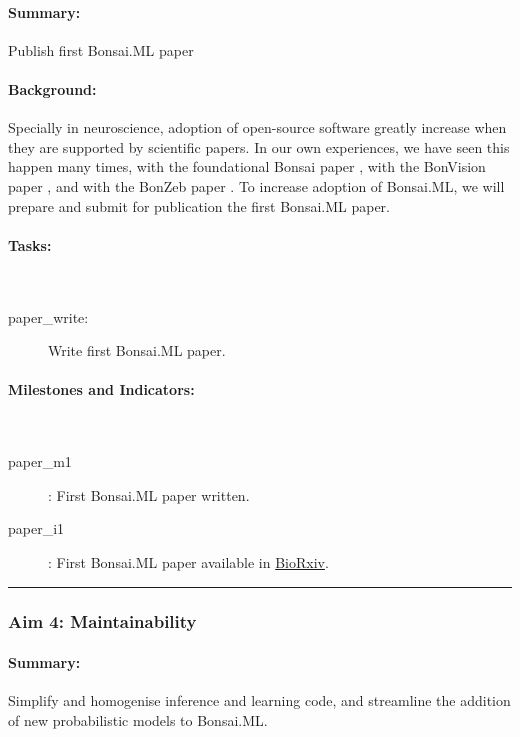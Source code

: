 \paragraph{Summary:} Publish first Bonsai.ML paper

\paragraph{Background:} Specially in neuroscience, adoption of open-source
software greatly increase when they are supported by scientific papers. In our
own experiences, we have seen this happen many times, with the foundational
Bonsai paper \citep{lopesEtAl15}, with the BonVision paper \citep{lopesEtAl21},
and with the BonZeb paper \citep{guilbeaultEtAl21}.
%
To increase adoption of Bonsai.ML, we will prepare and submit for publication
the first Bonsai.ML paper.

\paragraph{Tasks:}\mbox{}\\

\begin{description}

    \item[paper\_write:] Write first Bonsai.ML paper.

\end{description}

\paragraph{Milestones and Indicators:}\mbox{}\\

\begin{description}

    \item[paper\_m1]: First Bonsai.ML paper written.
    \item[paper\_i1]: First Bonsai.ML paper available in
        \href{https://www.biorxiv.org/}{BioRxiv}.

\end{description}

\noindent\rule{\textwidth}{1pt}
\subsubsection{Aim 4: Maintainability}

\paragraph{Summary:} Simplify and homogenise inference and learning code, and streamline the addition of new probabilistic models to Bonsai.ML.

